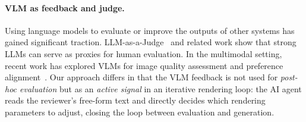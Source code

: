 \paragraph{VLM as feedback and judge.}
Using language models to evaluate or improve the outputs of other systems
has gained significant traction.
LLM-as-a-Judge~\cite{PLACEHOLDER_zheng2024llamajudge_verify} and related work show
that strong LLMs can serve as proxies for human evaluation.
In the multimodal setting, recent work has explored VLMs for image quality assessment
\cite{PLACEHOLDER_ku2024imagereward_verify} and preference alignment~\cite{PLACEHOLDER_xu2024imagereward2_verify}.
Our approach differs in that the VLM feedback is not used for
\emph{post-hoc evaluation} but as an \emph{active signal} in an iterative rendering loop:
the AI agent reads the reviewer's free-form text and directly decides
which rendering parameters to adjust, closing the loop between evaluation and generation.
